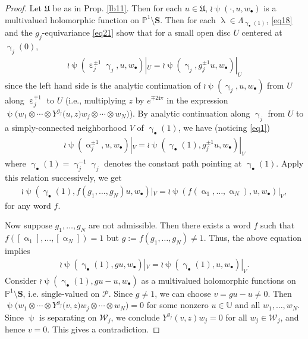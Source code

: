 \documentclass[12pt,a4paper,notitlepage]{article}
\theoremstyle{definition}
\theoremstyle{plain}
\newcommand{\fk}{\mathfrak}
\newcommand{\mc}{\mathcal}
\newcommand{\im}{\mathbf{i}}
\newcommand{\blt}{\bullet}
\newcommand{\Ubb}{\mathbb U}
\newcommand{\Pbb}{\mathbb P}
\newcommand{\Sbf}{\mathbf{S}}
\numberwithin{equation}{subsection}
\begin{document}
\begin{proof}
Let $\fk U$ be as in Prop. \ref{lb11}. Then for each $u\in\fk U$, $\wr\uppsi(\cdot,u,w_\blt)$ is a multivalued holomorphic function on $\Pbb^1\setminus\Sbf$.  Then for each $\uplambda\in\Lambda_{\upgamma_\blt(1)}$, \eqref{eq18} and the $g_j$-equivariance \eqref{eq21} show that for  a small open disc $U$ centered at $\upgamma_j(0)$,
	\begin{align*}
		\wr\uppsi(\upepsilon_j^{\pm 1}\upgamma_j,u,w_\blt)|_U=	\wr\uppsi(\upgamma_j,g_j^{\pm 1}u,w_\blt)|_U
	\end{align*}
	since the left hand side is the analytic continuation of $\wr\uppsi(\upgamma_j,u,w_\blt)$ from $U$ along $\upepsilon_j^{\mp 1}$ to $U$ (i.e.,  multiplying $z$ by $e^{\mp2\im\pi}$   in the expression $\uppsi\big(w_1\otimes\cdots\otimes Y^{g_j}\big(u,z\big)w_j\otimes\cdots\otimes w_N\big)$). By analytic continuation along $\upgamma_j$ from $U$ to a simply-connected neighborhood $V$ of $\upgamma_\blt(1)$, we have (noticing \eqref{eq1})
	\begin{align}
		\wr\uppsi(\upalpha_j^{\pm1},u,w_\blt)|_V=	\wr\uppsi(\upgamma_\blt(1),g_j^{\pm1}u,w_\blt)|_V\label{eq42}
	\end{align}
	where $\upgamma_\blt(1)=\upgamma_j^{-1}\upgamma_j$ denotes the constant path pointing at $\upgamma_\blt(1)$. Apply this relation successively, we get
	\begin{align*}
		\wr\uppsi(\upgamma_\blt(1),f(g_1,\dots,g_N)u,w_\blt)|_V=\wr\uppsi(f(\upalpha_1,\dots,\upalpha_N),u,w_\blt)|_V,
	\end{align*}
for any word $f$.

Now suppose $g_1,\dots,g_N$ are not admissible. Then there exists a word $f$ such that $f([\upalpha_1],\dots,[\upalpha_N])=1$ but $g:=f(g_1,\dots,g_N)\neq 1$. Thus, the above equation implies 	\begin{align*}
\wr\uppsi(\upgamma_\blt(1),gu,w_\blt)|_V=\wr\uppsi(\upgamma_\blt(1),u,w_\blt)|_V.
\end{align*}
Consider $\wr\uppsi(\upgamma_\blt(1),gu-u,w_\blt)$ as a multivalued holomorphic functions on $\Pbb^1\setminus\Sbf$, i.e. single-valued on $\mc P$. Since $g\neq 1$, we can choose $v=gu-u\neq 0$. Then $\uppsi\big(w_1\otimes\cdots\otimes Y^{g_j}\big(v,z\big)w_j\otimes\cdots\otimes w_N\big)=0$ for some nonzero $u\in\Ubb$ and all $w_1,\dots,w_N$. Since $\uppsi$ is separating on $\mc W_j$, we conclude $Y^{g_j}(v,z)w_j=0$ for all $w_j\in\mc W_j$, and hence $v=0$. This gives a contradiction. 
\end{proof}
\end{document}
